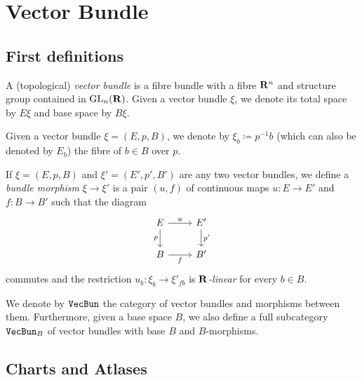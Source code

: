 \documentclass[../../../deep-dive]{subfile}
\begin{document}
\section{Vector Bundle}

\subsection{First definitions}

\begin{definition}
\label{def:vector-bundle}
A (topological) \emph{vector bundle} is a fibre bundle with a fibre \(\mathbf{R}^n\) and
structure group contained in \(\operatorname{GL}_n(\mathbf{R})\). Given a vector bundle \(\xi\), we
denote its total space by \(E \xi\) and base space by \(B \xi\).
\end{definition}

\begin{notation}
\label{not:fibre-of-vector-bundle}
Given a vector bundle \(\xi = (E, p, B)\), we denote by
\(\xi_b \coloneq p^{-1} b\) (which can also be denoted by \(E_b\)) the fibre of
\(b \in B\) over \(p\).
\end{notation}

\begin{definition}
\label{def:morphism-vector-bundles}
If \(\xi = (E, p, B)\) and \(\xi' = (E', p', B')\) are any two vector bundles,
we define a \emph{bundle morphism} \(\xi \to \xi'\) is a pair \((u, f)\) of
continuous maps \(u: E \to E'\) and \(f: B \to B'\) such that the diagram
\[
\begin{tikzcd}
E \ar[d, "p"'] \ar[r, "u"] &E' \ar[d, "p'"] \\
B \ar[r, "f"'] &B'
\end{tikzcd}
\]
commutes and the restriction \(u_b: \xi_b \to \xi'_{f b}\) is
\emph{\(\mathbf{R}\)-linear} for every \(b \in B\).
\end{definition}

\begin{definition}
\label{def:vector-bundle-category}
We denote by \({\texttt{VecBun}}\) the category of vector bundles and morphisms between
them. Furthermore, given a base space \(B\), we also define a full subcategory
\({\texttt{VecBun}}_B\) of vector bundles with base \(B\) and \(B\)-morphisms.
\end{definition}

\subsection{Charts and Atlases}
\end{document}
